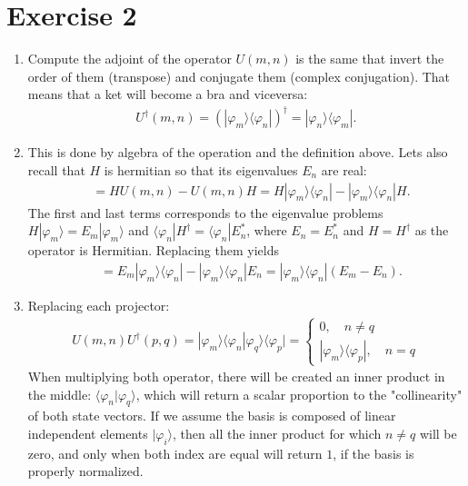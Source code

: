 \documentclass[letterpaper,11pt,twoside]{article}
\begin{document}
\section{Exercise 2}
\begin{enumerate}[itemsep=0pt,topsep=0pt,label=\alph*.]
  \item Compute the adjoint of the operator $U(m,n)$ is the same that invert the order of them (transpose) and conjugate them (complex conjugation).
  That means that a ket will become a bra and viceversa: 
  \begin{align*}
    U^\dagger(m,n)=(|\varphi_m\rangle\langle\varphi_n|)^\dagger=|\varphi_n\rangle\langle \varphi_m|.
  \end{align*}
  \item This is done by algebra of the operation and the definition above. Lets also
  recall that $H$ is hermitian so that its eigenvalues $E_n$ are real:
  \begin{align*}
    [H,U(m,n)]&=HU(m,n)-U(m,n)H=H|\varphi_m\rangle\langle\varphi_n|-|\varphi_m\rangle\langle\varphi_n|H.
  \end{align*}
  The first and last terms corresponds to the eigenvalue problems $H|\varphi_m\rangle=E_m|\varphi_m\rangle$ and $\langle\varphi_n|H^\dagger=\langle\varphi_n|E^*_n$, where 
  $E_n=E^*_n$ and $H=H^\dagger$ as the operator is Hermitian. Replacing them yields
  \begin{align*}
    [H,U(m,n)]&=E_m|\varphi_m\rangle\langle\varphi_n|-|\varphi_m\rangle \langle\varphi_ n|E_n=|\varphi_m\rangle \langle\varphi_ n|(E_m-E_n).
  \end{align*}
  \item Replacing each projector:
  \begin{align*}
    U(m,n)U^\dagger (p,q)=|\varphi_m\rangle\langle\varphi_n|\varphi_q\rangle\langle\varphi_p|=\begin{cases}
      0,\quad n\neq q\\
      |\varphi_m\rangle\langle\varphi_p|,\quad n=q
    \end{cases}
  \end{align*}
  When multiplying both operator, there will be created an inner product in the middle: $\langle\varphi_n|\varphi_q\rangle$, which 
  will return a scalar proportion to the "collinearity" of both state vectors. If we assume the basis is composed of linear independent elements $|\varphi_i\rangle$,
  then all the inner product for which $n\neq q$ will be zero, and only when both index are equal will return $1$, if the basis is properly normalized.

\end{enumerate}
\end{document}

